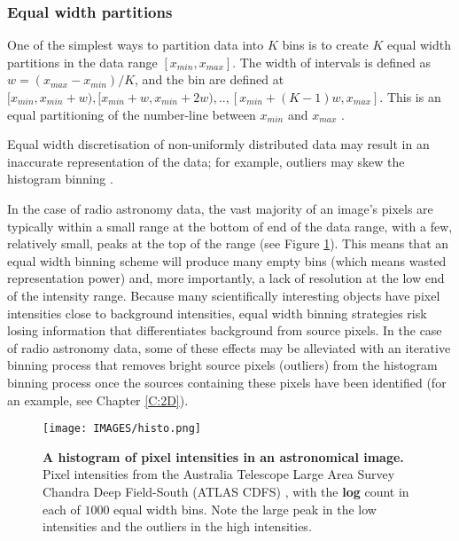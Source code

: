 \subsubsection{Equal width partitions}\label{sec:wid}
One of the simplest ways to partition data into $K$ bins is to create $K$ equal width partitions in the data range $[x_{min},x_{max}]$. The width of intervals is defined as $w = (x_{max} - x_{min})/K$, and the bin are defined at $[x_{min}, x_{min}+w), [x_{min}+w, x_{min}+2w), .. ,[x_{min}+(K-1)w,x_{max}]$. This is an equal partitioning of the number-line between $x_{min}$ and $x_{max}$ \cite{yang2010discretization}.

Equal width discretisation of non-uniformly distributed data may result in an inaccurate representation of the data; for example, outliers may skew the histogram binning \cite{dougherty1995supervised,kotsiantis2006discretization,liu2002discretization}. 

In the case of radio astronomy data, the vast majority of an image's pixels are typically within a small range at the bottom of end of the data range, with a few, relatively small, peaks at the top of the range (see Figure \ref{fig:histo}). This means that an equal width binning scheme will produce many empty bins (which means wasted representation power) and, more importantly, a lack of resolution at the low end of the intensity range. Because many scientifically interesting objects have pixel intensities close to background intensities, equal width binning strategies risk losing information that differentiates background from source pixels. In the case of radio astronomy data, some of these effects may be alleviated with an iterative binning process that removes bright source pixels (outliers) from the histogram binning process once the sources containing these pixels have been identified (for an example, see Chapter \ref{C:2D}).

\begin{figure}
\centering
\texttt{[image: IMAGES/histo.png]}
\caption[A histogram of pixel intensities in an astronomical image]{\textbf{A histogram of pixel intensities in an astronomical image.} Pixel intensities from the Australia Telescope Large Area Survey Chandra Deep Field-South (ATLAS CDFS) \cite{norris2006deep}, with the \textbf{log} count in each of $1000$ equal width bins. Note the large peak in the low intensities and the outliers in the high intensities.}
\label{fig:histo}
\end{figure}

